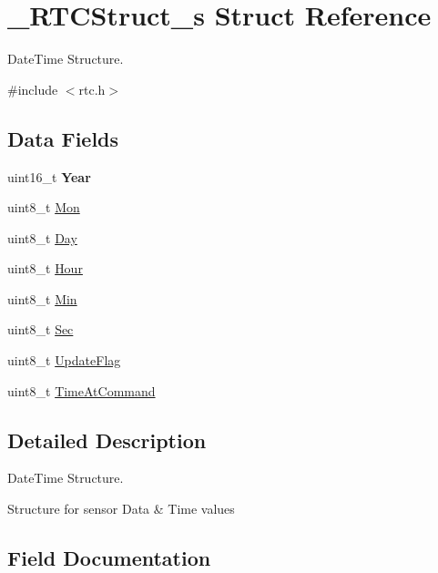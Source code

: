 \hypertarget{struct___r_t_c_struct__s}{}\section{\+\_\+\+R\+T\+C\+Struct\+\_\+s Struct Reference}
\label{struct___r_t_c_struct__s}


Date\+Time Structure.  




{\ttfamily \#include $<$rtc.\+h$>$}

\subsection*{Data Fields}
\begin{DoxyCompactItemize}
\item 
\hypertarget{struct___r_t_c_struct__s_a5440b090b3d142031ea11ee8d350dc63}{}uint16\+\_\+t {\bfseries Year}\label{struct___r_t_c_struct__s_a5440b090b3d142031ea11ee8d350dc63}

\item 
uint8\+\_\+t \hyperlink{struct___r_t_c_struct__s_a6fbaba1425c962fcc411716d7c4dfcbd}{Mon}
\item 
uint8\+\_\+t \hyperlink{struct___r_t_c_struct__s_a685ae534ac9b397ce1b7e312cd180568}{Day}
\item 
uint8\+\_\+t \hyperlink{struct___r_t_c_struct__s_a000e4faf8c0a1d07d99fe67f7f56be57}{Hour}
\item 
uint8\+\_\+t \hyperlink{struct___r_t_c_struct__s_a46cea0aed4bfe8e09e0220b530eca314}{Min}
\item 
uint8\+\_\+t \hyperlink{struct___r_t_c_struct__s_aba0dd5d75a356b633902e4b35e9d9a21}{Sec}
\item 
uint8\+\_\+t \hyperlink{struct___r_t_c_struct__s_ae3cd5de8a74a11304d1d296efe219545}{Update\+Flag}
\item 
uint8\+\_\+t \hyperlink{struct___r_t_c_struct__s_aea562614f5f4bba45a661bf5b04fe2bf}{Time\+At\+Command}
\end{DoxyCompactItemize}


\subsection{Detailed Description}
Date\+Time Structure. 

Structure for sensor Data \& Time values 

\subsection{Field Documentation}
\hypertarget{struct___r_t_c_struct__s_a685ae534ac9b397ce1b7e312cd180568}{}
